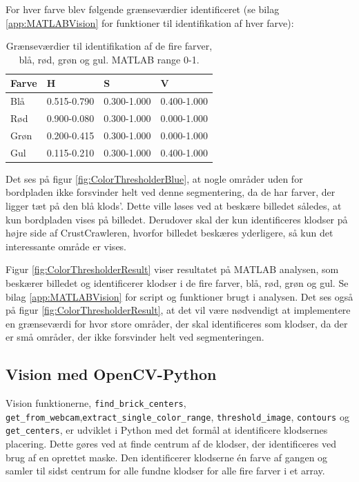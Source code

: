 
For hver farve blev følgende grænseværdier identificeret (se bilag \vref{app:MATLABVision} for funktioner til identifikation af hver farve):
\begin{table}[H]
\centering
\begin{tabular}{l|l|l|l}
Farve	&	H			&	S			&	V\\
\hline
Blå		&	0.515-0.790	&	0.300-1.000	&	0.400-1.000\\
Rød		&	0.900-0.080	&	0.300-1.000	&	0.000-1.000\\
Grøn	&	0.200-0.415	&	0.300-1.000	&	0.000-1.000\\
Gul		&	0.115-0.210	&	0.300-1.000	&	0.400-1.000\\
\end{tabular}	
\caption{Grænseværdier til identifikation af de fire farver, blå, rød, grøn og gul. MATLAB range 0-1.}
\end{table}

Det ses på figur \vref{fig:ColorThresholderBlue}, at nogle områder uden for bordpladen ikke forsvinder helt ved denne segmentering, da de har farver, der ligger tæt på den blå klods'.
Dette ville løses ved at beskære billedet således, at kun bordpladen vises på billedet.
Derudover skal der kun identificeres klodser på højre side af CrustCrawleren, hvorfor billedet beskæres yderligere, så kun det interessante område er vises.

Figur \vref{fig:ColorThresholderResult} viser resultatet på MATLAB analysen, som beskærer billedet og identificerer klodser i de fire farver, blå, rød, grøn og gul.
Se bilag \vref{app:MATLABVision} for script og funktioner brugt i analysen.
Det ses også på figur \ref{fig:ColorThresholderResult}, at det vil være nødvendigt at implementere en grænseværdi for hvor store områder, der skal identificeres som klodser, da der er små områder, der ikke forsvinder helt ved segmenteringen.


\subsection{Vision med OpenCV-Python}
Vision funktionerne, \texttt{find\_brick\_centers}, \texttt{get\_from\_webcam},\newline \texttt{extract\_single\_color\_range}, \texttt{threshold\_image}, \texttt{contours} og \texttt{get\_centers}, er udviklet i Python med det formål at identificere klodsernes placering.
Dette gøres ved at finde centrum af de klodser, der identificeres ved brug af en oprettet maske.
Den identificerer klodserne én farve af gangen og samler til sidst centrum for alle fundne klodser for alle fire farver i et array.

